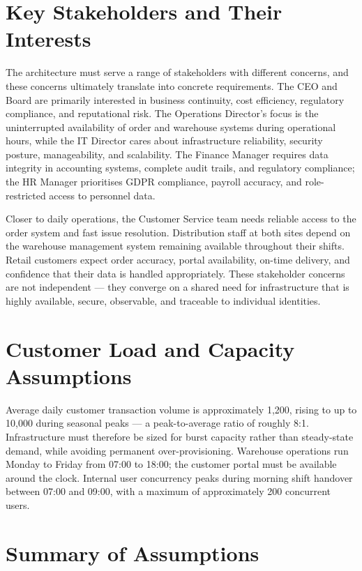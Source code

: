 \section{Key Stakeholders and Their Interests}

\label{tab:stakeholders}The architecture must serve a range of stakeholders with different concerns, and these concerns ultimately translate into concrete requirements. The CEO and Board are primarily interested in business continuity, cost efficiency, regulatory compliance, and reputational risk. The Operations Director's focus is the uninterrupted availability of order and warehouse systems during operational hours, while the IT Director cares about infrastructure reliability, security posture, manageability, and scalability. The Finance Manager requires data integrity in accounting systems, complete audit trails, and regulatory compliance; the HR Manager prioritises GDPR compliance, payroll accuracy, and role-restricted access to personnel data.

Closer to daily operations, the Customer Service team needs reliable access to the order system and fast issue resolution. Distribution staff at both sites depend on the warehouse management system remaining available throughout their shifts. Retail customers expect order accuracy, portal availability, on-time delivery, and confidence that their data is handled appropriately. These stakeholder concerns are not independent --- they converge on a shared need for infrastructure that is highly available, secure, observable, and traceable to individual identities.

\section{Customer Load and Capacity Assumptions}

Average daily customer transaction volume is approximately 1{,}200, rising to up to 10{,}000 during seasonal peaks --- a peak-to-average ratio of roughly 8:1. Infrastructure must therefore be sized for burst capacity rather than steady-state demand, while avoiding permanent over-provisioning. Warehouse operations run Monday to Friday from 07:00 to 18:00; the customer portal must be available around the clock. Internal user concurrency peaks during morning shift handover between 07:00 and 09:00, with a maximum of approximately 200 concurrent users.

\section{Summary of Assumptions}

